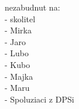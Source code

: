 
nezabudnut na: \\
- skolitel \\
- Mirka \\
- Jaro \\
- Lubo \\
- Kubo \\
- Majka \\
- Maru \\
- Spoluziaci z DPSi
